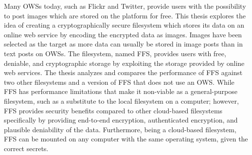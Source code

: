 




Many \gls{OWS}s today, such as Flickr and Twitter, provide users with the possibility to post images which are stored on the platform for free. This thesis explores the idea of creating a cryptographically secure filesystem which stores its data on an online web service by encoding the encrypted data as images. Images have been selected as the target as more data can usually be stored in image posts than in text posts on \gls{OWS}s. The filesystem, named \gls{FFS}, provides users with free, deniable, and cryptographic storage by exploiting the storage provided by online web services. The thesis analyzes and compares the performance of \gls{FFS} against two other filesystems and a version of \gls{FFS} that does not use an \gls{OWS}. While \gls{FFS} has performance limitations that make it \mbox{non-viable} as a \mbox{general-purpose} filesystem, such as a substitute to the local filesystem on a computer; however, \gls{FFS} provides security benefits compared to other \mbox{cloud-based} filesystems specifically by providing \mbox{end-to-end} encryption, authenticated encryption, and plausible deniability of the data. Furthermore, being a \mbox{cloud-based} filesystem, \gls{FFS} can be mounted on any computer with the same operating system, given the correct secrets. 

